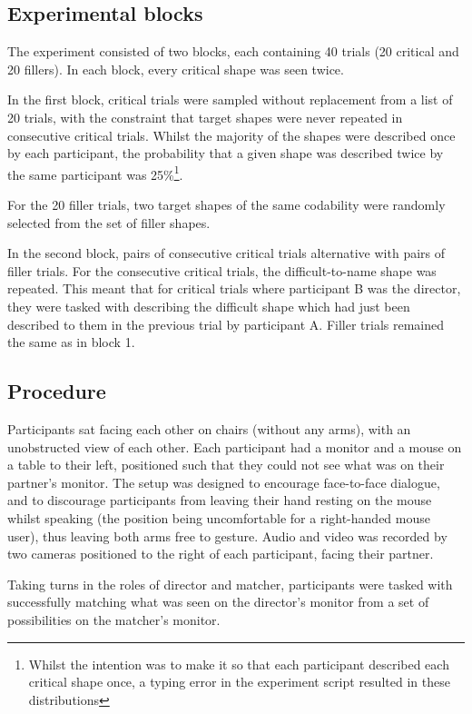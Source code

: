 \documentclass[a4paper,man,natbib]{apa6}
\begin{document}
\subsection{Experimental blocks}

The experiment consisted of two blocks, each containing 40 trials (20 critical and 20 fillers). 
In each block, every critical shape was seen twice.

In the first block, critical trials were sampled without replacement from a list of 20 trials, with the constraint that target shapes were never repeated in consecutive critical trials.
Whilst the majority of the shapes were described once by each participant, the probability that a given shape was described twice by the same participant was 25\%\footnote{Whilst the intention was to make it so that each participant described each critical shape once, a typing error in the experiment script resulted in these distributions}. 

For the 20 filler trials, two target shapes of the same codability were randomly selected from the set of filler shapes.

In the second block, pairs of consecutive critical trials alternative with pairs of filler trials. 
For the consecutive critical trials, the difficult-to-name shape was repeated.
This meant that for critical trials where participant B was the director, they were tasked with describing the difficult shape which had just been described to them in the previous trial by participant A.
Filler trials remained the same as in block 1. 


\subsection{Procedure}
Participants sat facing each other on chairs (without any arms), with an unobstructed view of each other.
Each participant had a monitor and a mouse on a table to their left, positioned such that they could not see what was on their partner's monitor.
The setup was designed to encourage face-to-face dialogue, and to discourage participants from leaving their hand resting on the mouse whilst speaking (the position being uncomfortable for a right-handed mouse user), thus leaving both arms free to gesture.
Audio and video was recorded by two cameras positioned to the right of each participant, facing their partner.

Taking turns in the roles of director and matcher, participants were tasked with successfully matching what was seen on the director's monitor from a set of possibilities on the matcher's monitor.
\end{document}
